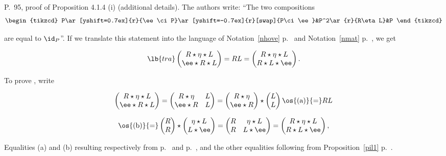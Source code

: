 \documentclass[12pt]{article}
\theoremstyle{remark}
\theoremstyle{definition}
\begin{document}
\begin{s} 
P.~95, proof of Proposition 4.1.4 (i) (additional details). The authors write: ``The two compositions 
$$
\begin{tikzcd}
P\ar[yshift=0.7ex]{r}{\ee\ci P}\ar[yshift=-0.7ex]{r}[swap]{P\ci\ee}&P^2\ar{r}{R\eta L}&P
\end{tikzcd}
$$ 

\nn are equal to $\id_P$''. If we translate this statement into the language of Notation~\ref{nhove} p.~ and Notation~\ref{nmat} p.~, we get 

\begin{equation}\lb{tra}
\begin{pmatrix}R\star\eta\star L\\ \ee\star R\star L\end{pmatrix}
=RL=\begin{pmatrix}R\star\eta\star L\\ R\star L\star\ee\end{pmatrix}.
\end{equation}

\nn To prove , write 

$$
\begin{pmatrix}R\star\eta\star L\\ \ee\star R\star L\end{pmatrix}
=\begin{pmatrix}R\star\eta&L\\ \ee\star R&L\end{pmatrix}
=\begin{pmatrix}R\star\eta\\ \ee\star R\end{pmatrix}\star\begin{pmatrix}L\\ L\end{pmatrix}
\os{\text{(a)}}{=}RL
$$

$$
\os{\text{(b)}}{=}\begin{pmatrix}R\\ R\end{pmatrix}\star\begin{pmatrix}\eta\star L\\ L\star\ee\end{pmatrix}
=\begin{pmatrix}R&\eta\star L\\ R&L\star\ee\end{pmatrix}
=\begin{pmatrix}R\star\eta\star L\\ R\star L\star\ee\end{pmatrix},
$$ 

\nn Equalities (a) and (b) resulting respectively from  p.~ and  p.~, and the other equalities following from Proposition~\ref{pil1} p.~. 
\end{s}
\end{document}
